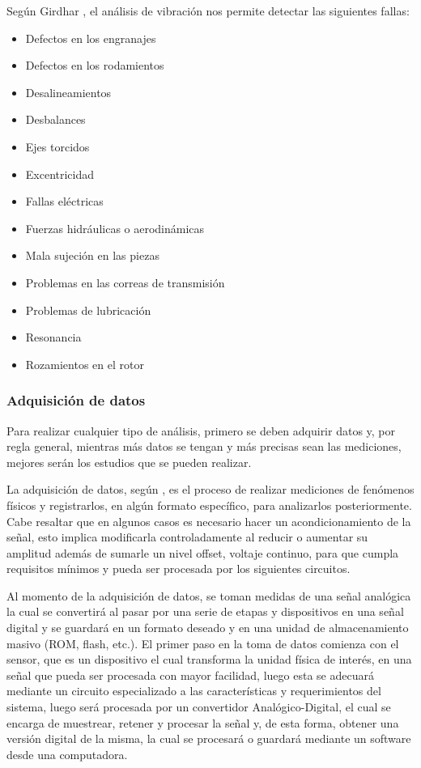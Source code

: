 Según Girdhar \Cite{Girdhar},  el análisis de vibración nos permite detectar las
siguientes fallas:

\begin{itemize}[noitemsep]

\item Defectos en los engranajes
\item Defectos en los rodamientos
\item Desalineamientos
\item Desbalances
\item Ejes torcidos
\item Excentricidad
\item Fallas eléctricas
\item Fuerzas hidráulicas o aerodinámicas
\item Mala sujeción en las piezas
\item Problemas en las correas de transmisión
\item Problemas de lubricación
\item Resonancia
\item Rozamientos en el rotor
\end{itemize}


\subsubsection*{Adquisición de datos}

Para realizar cualquier tipo de análisis, primero se deben adquirir datos y,
por regla general, mientras más datos se tengan y más precisas sean las
mediciones, mejores serán los estudios que se pueden realizar.


La adquisición de datos, según \cite{adquisiciondatos}, es el proceso de
realizar mediciones de fenómenos físicos
y registrarlos, en algún formato específico, para analizarlos posteriormente.
Cabe resaltar que en algunos casos es necesario hacer un acondicionamiento de
la señal, esto
implica modificarla controladamente al reducir o aumentar su amplitud además de
sumarle un nivel offset, voltaje continuo, para que cumpla requisitos mínimos
y pueda ser procesada por los siguientes circuitos.

Al momento de la adquisición de datos, se toman medidas de una señal analógica
la cual se convertirá al pasar por una serie de etapas y dispositivos en una
señal digital y se guardará en un formato deseado y en una unidad de
almacenamiento masivo (ROM, flash, etc.).
El primer paso en la toma de  datos comienza con el sensor, que es un
dispositivo el cual transforma la unidad física de interés, en una señal que
pueda ser procesada con mayor facilidad, luego esta se adecuará mediante un
circuito especializado a las características y requerimientos del sistema,
luego será procesada por un convertidor Analógico-Digital, el cual se encarga de
muestrear, retener y procesar la señal y, de esta forma, obtener una versión
digital de la misma, la cual se procesará o guardará mediante un software desde
una computadora.

